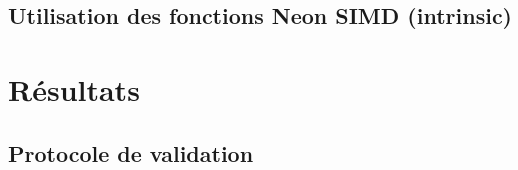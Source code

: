 \documentclass{article}
\begin{document}
    \subsection{Utilisation des fonctions Neon SIMD (intrinsic)}




    \section{Résultats}
    \subsection{Protocole de validation}


\end{document}
